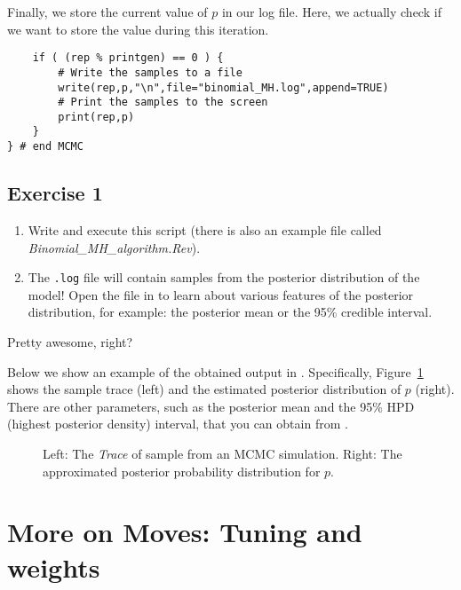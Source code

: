 Finally, we store the current value of $p$ in our log file.
Here, we actually check if we want to store the value during this iteration.
{\tt \begin{snugshade*}
\begin{lstlisting}
    if ( (rep % printgen) == 0 ) {
        # Write the samples to a file
        write(rep,p,"\n",file="binomial_MH.log",append=TRUE)
        # Print the samples to the screen
        print(rep,p)
    }
} # end MCMC\end{lstlisting}
\end{snugshade*}}


\subsection{Exercise 1}

\begin{enumerate}[label=\textnormal{Step \arabic*)}]
	\item Write and execute this script (there is also an example file called \emph{Binomial\_MH\_algorithm.Rev}).
	\item The \texttt{.log} file will contain samples from the posterior distribution of the model! Open the file in \Tracer to learn about various features of the posterior distribution, for example: the posterior mean or the 95\% credible interval.
\end{enumerate}
Pretty awesome, right?

Below we show an example of the obtained output in \Tracer.
Specifically, Figure~\ref{fig:mcmc_samples} shows the sample trace (left) and the estimated posterior distribution of $p$ (right).
There are other parameters, such as the posterior mean and the 95\% HPD (highest posterior density) interval, that you can obtain from \Tracer.
\begin{figure}[h!]
\centering
{}
\label{fig:mcmc_samples}
\caption{Left: The \emph{Trace} of sample from an MCMC simulation. Right: The approximated posterior probability distribution for $p$.}
\end{figure}

\section{More on Moves: Tuning and weights}

